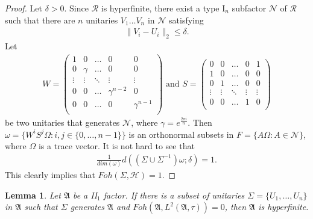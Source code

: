 \documentclass[a4paper,10pt]{amsart}
\newtheorem{lemma}{Lemma}[section]
\newcommand{\AAA}{\mathfrak A}
\newcommand{\HHH}{\mathscr H} %
\newcommand{\RR}{\mathcal R}
\begin{document}
\begin{proof}
    Let $\delta > 0$.
    Since $\RR$ is hyperfinite, there exist a type I$_n$ subfactor $\mathcal{N}$ 
    of $\RR$ such that there are $n$ unitaries $V_1 \ldots V_n$ in $\mathcal{N}$
    satisfying
    \begin{align*}
       \|V_i - U_i\|_2 \leq \delta. 
    \end{align*}
    Let
    \begin{align*}
       W = \begin{pmatrix}
           1 & 0 & \ldots & 0 & 0\\
           0 & \gamma & \ldots & 0 & 0\\
           \vdots & \vdots & \ddots &\vdots & \vdots\\
           0 & 0& \ldots & \gamma^{n-2} & 0\\
           0 & 0 & \ldots & 0 &\gamma^{n-1}\\
       \end{pmatrix} \mbox{ and }  
        S = \begin{pmatrix}
           0 & 0 & \ldots & 0 & 1\\
           1 & 0 & \ldots & 0 & 0\\
           0 & 1 & \ldots & 0 & 0\\
           \vdots & \vdots & \ddots & \vdots & \vdots\\
           0 & 0 & \ldots & 1 & 0\\
       \end{pmatrix}
    \end{align*}
    be two unitaries that generates $\mathcal{N}$, where $\gamma = e^{\frac{2\pi i}{n}}$.
    Then $\omega = \{W^{i}S^{j}\Omega : i,j \in \{0,\ldots, n-1 \}\}$ is 
    an orthonormal subsets in $F = \{A \Omega : A \in \mathcal{N}\}$, where $\Omega$ is a
    trace vector. It is not hard to see that
    \begin{align*}
           \frac{1}{dim(\omega)}d\left 
           ((\Sigma \cup \Sigma^{-1})\omega
            ; \delta \right ) = 1.
    \end{align*}
    This clearly implies that $Foh(\Sigma, \HHH) = 1$. 
\end{proof}

\begin{lemma}
    Let $\AAA$ be a II$_1$ factor. If there is a subset of unitaries 
    $\Sigma = \{U_1, \ldots, U_n\}$ in $\AAA$ such that $\Sigma$ generates 
    $\AAA$ and $Foh(\AAA, L^{2}(\AAA, \tau)) = 0$, then $\AAA$ is hyperfinite.
\end{lemma}
\end{document}
